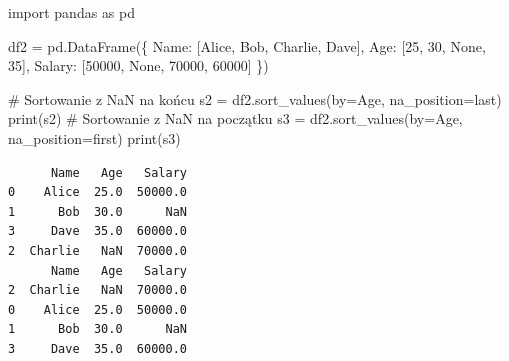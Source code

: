\documentclass[
  polish,
  letterpaper,
  DIV=11,
  numbers=noendperiod]{scrreprt}
\newenvironment{Shaded}{\begin{snugshade}}{\end{snugshade}}
\newcommand{\BuiltInTok}[1]{\textcolor[rgb]{0.00,0.23,0.31}{#1}}
\newcommand{\CommentTok}[1]{\textcolor[rgb]{0.37,0.37,0.37}{#1}}
\newcommand{\DecValTok}[1]{\textcolor[rgb]{0.68,0.00,0.00}{#1}}
\newcommand{\ImportTok}[1]{\textcolor[rgb]{0.00,0.46,0.62}{#1}}
\newcommand{\NormalTok}[1]{\textcolor[rgb]{0.00,0.23,0.31}{#1}}
\newcommand{\OperatorTok}[1]{\textcolor[rgb]{0.37,0.37,0.37}{#1}}
\newcommand{\StringTok}[1]{\textcolor[rgb]{0.13,0.47,0.30}{#1}}
\newcommand{\VariableTok}[1]{\textcolor[rgb]{0.07,0.07,0.07}{#1}}
\begin{document}
\begin{Shaded}
\begin{Highlighting}[]
\ImportTok{import}\NormalTok{ pandas }\ImportTok{as}\NormalTok{ pd}

\NormalTok{df2 }\OperatorTok{=}\NormalTok{ pd.DataFrame(\{}
    \StringTok{\textquotesingle{}Name\textquotesingle{}}\NormalTok{: [}\StringTok{\textquotesingle{}Alice\textquotesingle{}}\NormalTok{, }\StringTok{\textquotesingle{}Bob\textquotesingle{}}\NormalTok{, }\StringTok{\textquotesingle{}Charlie\textquotesingle{}}\NormalTok{, }\StringTok{\textquotesingle{}Dave\textquotesingle{}}\NormalTok{],}
    \StringTok{\textquotesingle{}Age\textquotesingle{}}\NormalTok{: [}\DecValTok{25}\NormalTok{, }\DecValTok{30}\NormalTok{, }\VariableTok{None}\NormalTok{, }\DecValTok{35}\NormalTok{],}
    \StringTok{\textquotesingle{}Salary\textquotesingle{}}\NormalTok{: [}\DecValTok{50000}\NormalTok{, }\VariableTok{None}\NormalTok{, }\DecValTok{70000}\NormalTok{, }\DecValTok{60000}\NormalTok{]}
\NormalTok{\})}

\CommentTok{\# Sortowanie z NaN na końcu}
\NormalTok{s2 }\OperatorTok{=}\NormalTok{ df2.sort\_values(by}\OperatorTok{=}\StringTok{\textquotesingle{}Age\textquotesingle{}}\NormalTok{, na\_position}\OperatorTok{=}\StringTok{\textquotesingle{}last\textquotesingle{}}\NormalTok{)}
\BuiltInTok{print}\NormalTok{(s2)}
\CommentTok{\# Sortowanie z NaN na początku}
\NormalTok{s3 }\OperatorTok{=}\NormalTok{ df2.sort\_values(by}\OperatorTok{=}\StringTok{\textquotesingle{}Age\textquotesingle{}}\NormalTok{, na\_position}\OperatorTok{=}\StringTok{\textquotesingle{}first\textquotesingle{}}\NormalTok{)}
\BuiltInTok{print}\NormalTok{(s3)}
\end{Highlighting}
\end{Shaded}

\begin{verbatim}
      Name   Age   Salary
0    Alice  25.0  50000.0
1      Bob  30.0      NaN
3     Dave  35.0  60000.0
2  Charlie   NaN  70000.0
      Name   Age   Salary
2  Charlie   NaN  70000.0
0    Alice  25.0  50000.0
1      Bob  30.0      NaN
3     Dave  35.0  60000.0
\end{verbatim}
\end{document}
